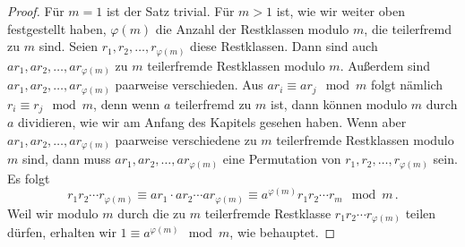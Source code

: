 \begin{proof}
	Für $m=1$ ist der Satz trivial. Für $m>1$ ist, wie wir weiter oben festgestellt haben, $\varphi(m)$ die Anzahl der Restklassen modulo $m$, die teilerfremd zu $m$ sind. Seien $r_1,r_2,\dotsc,r_{\varphi(m)}$ diese Restklassen. Dann sind auch $ar_1,ar_2,\dotsc,ar_{\varphi(m)}$ zu $m$ teilerfremde Restklassen modulo $m$. Außerdem sind $ar_1,ar_2,\dotsc,ar_{\varphi(m)}$ paarweise verschieden. Aus $ar_i\equiv ar_j\mod m$ folgt nämlich $r_i\equiv r_j\mod m$, denn wenn $a$ teilerfremd zu $m$ ist, dann können modulo $m$ durch $a$ dividieren, wie wir am Anfang des Kapitels gesehen haben. Wenn aber $ar_1,ar_2,\dotsc,ar_{\varphi(m)}$ paarweise verschiedene zu $m$ teilerfremde Restklassen modulo $m$ sind, dann muss $ar_1,ar_2,\dotsc,ar_{\varphi(m)}$ eine Permutation von $r_1,r_2,\dotsc,r_{\varphi(m)}$ sein. Es folgt
	\begin{equation*}
		r_1r_2\dotsb r_{\varphi(m)}\equiv ar_1\cdot ar_2\dotsm ar_{\varphi(m)}\equiv a^{\varphi(m)}r_1r_2\dotsm r_m\mod m\,.
	\end{equation*}
	Weil wir modulo $m$ durch die zu $m$ teilerfremde Restklasse $r_1r_2\dotsm r_{\varphi(m)}$ teilen dürfen, erhalten wir $1\equiv a^{\varphi(m)}\mod m$, wie behauptet.
\end{proof}

